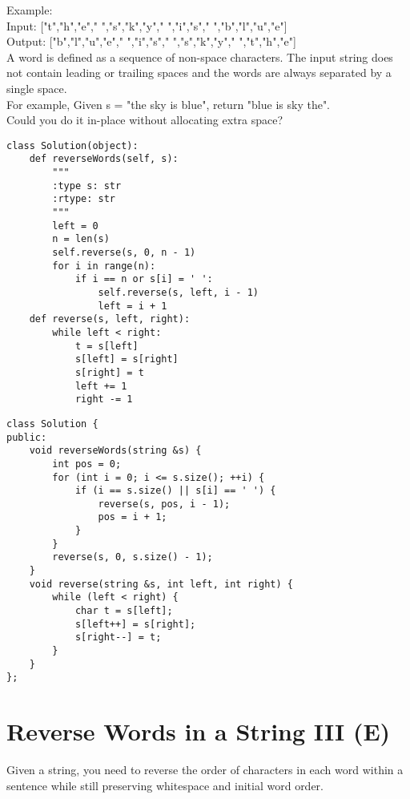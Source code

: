 Example:\\

Input:  ["t","h","e"," ","s","k","y"," ","i","s"," ","b","l","u","e"]\\
Output: ["b","l","u","e"," ","i","s"," ","s","k","y"," ","t","h","e"]\\

A word is defined as a sequence of non-space characters. The input string does not contain leading or trailing spaces and the words are always separated by a single space.\\

For example,
Given s = "the sky is blue",
return "blue is sky the".\\

Could you do it in-place without allocating extra space? \\

\begin{lstlisting}
class Solution(object):
    def reverseWords(self, s):
        """
        :type s: str
        :rtype: str
        """
        left = 0
        n = len(s)
        self.reverse(s, 0, n - 1)
        for i in range(n):
            if i == n or s[i] = ' ':
                self.reverse(s, left, i - 1)
                left = i + 1
    def reverse(s, left, right):
        while left < right:
            t = s[left]
            s[left] = s[right]
            s[right] = t
            left += 1
            right -= 1
\end{lstlisting}

\begin{lstlisting}
class Solution {
public:
    void reverseWords(string &s) {
        int pos = 0;
        for (int i = 0; i <= s.size(); ++i) {
            if (i == s.size() || s[i] == ' ') {
                reverse(s, pos, i - 1);
                pos = i + 1;
            }
        }
        reverse(s, 0, s.size() - 1);
    }
    void reverse(string &s, int left, int right) {
        while (left < right) {
            char t = s[left];
            s[left++] = s[right];
            s[right--] = t;
        }
    }
};
\end{lstlisting}

\section{Reverse Words in a String III (E)}
Given a string, you need to reverse the order of characters in each word within a sentence while still preserving whitespace and initial word order.\\

